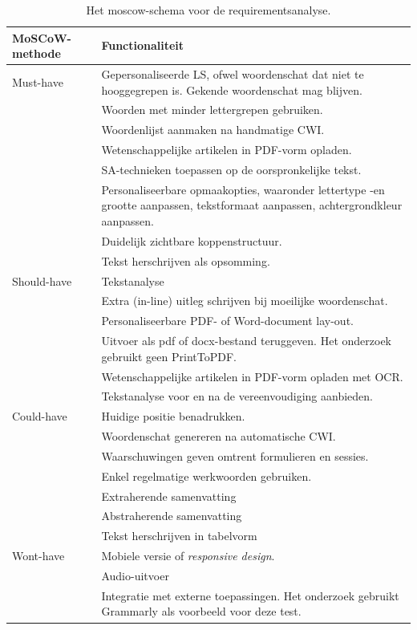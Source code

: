\begin{center}
	\begin{table}[H]
		\begin{tabular}{ | m{2cm} | m{13cm} | } 
			\hline
			\textbf{MoSCoW-methode} & \textbf{Functionaliteit} \\
			\hline
			Must-have & Gepersonaliseerde LS, ofwel woordenschat dat niet te hooggegrepen is. Gekende woordenschat mag blijven. \\
			& Woorden met minder lettergrepen gebruiken. \\
			& Woordenlijst aanmaken na handmatige CWI. \\
			& Wetenschappelijke artikelen in PDF-vorm opladen. \\
			& SA-technieken toepassen op de oorspronkelijke tekst. \\
			& Personaliseerbare opmaakopties, waaronder lettertype -en grootte aanpassen, tekstformaat aanpassen, achtergrondkleur aanpassen. \\
			& Duidelijk zichtbare koppenstructuur. \\
			& Tekst herschrijven als opsomming. \\
			\hline
			Should-have & Tekstanalyse \\
			& Extra (in-line) uitleg schrijven bij moeilijke woordenschat. \\
			& Personaliseerbare PDF- of Word-document lay-out. \\
			& Uitvoer als pdf of docx-bestand teruggeven. Het onderzoek gebruikt geen PrintToPDF. \\
			& Wetenschappelijke artikelen in PDF-vorm opladen met OCR. \\
			& Tekstanalyse voor en na de vereenvoudiging aanbieden. \\
			\hline
			Could-have & Huidige positie benadrukken.\\
			& Woordenschat genereren na automatische CWI. \\
			& Waarschuwingen geven omtrent formulieren en sessies. \\
			& Enkel regelmatige werkwoorden gebruiken. \\
			& Extraherende samenvatting \\
			& Abstraherende samenvatting \\
			& Tekst herschrijven in tabelvorm \\
			\hline
			Wont-have & Mobiele versie of \textit{responsive design}. \\
			& Audio-uitvoer \\
			& Integratie met externe toepassingen. Het onderzoek gebruikt Grammarly als voorbeeld voor deze test. \\
			\hline
		\end{tabular}
		\caption{Het moscow-schema voor de requirementsanalyse.}
		\label{img:moscow-table}
	\end{table}
\end{center}

